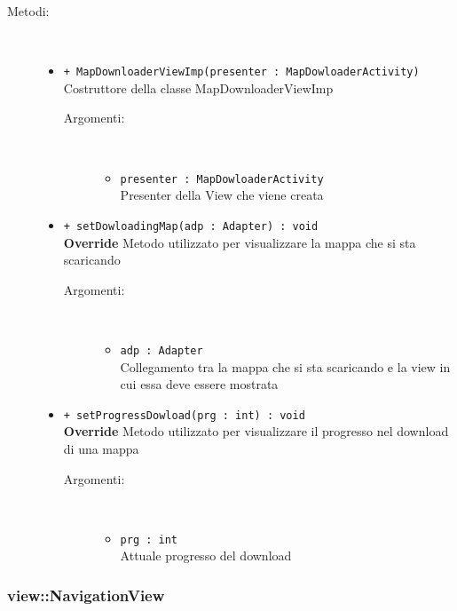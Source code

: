 \documentclass[../DefinizioneDiProdotto.tex]{subfiles}
\begin{document}
\begin{description}
\begin{itemize}
\end{itemize}
\item[Metodi:] \
\begin{itemize}
\item \texttt{+ MapDownloaderViewImp(presenter : MapDowloaderActivity)}\\
Costruttore della classe MapDownloaderViewImp
 \begin{description}
\item[Argomenti:] \
\begin{itemize}
\item \texttt{presenter : MapDowloaderActivity}\\
Presenter della View che viene creata\end{itemize}
\end{description}
\item \texttt{+ setDowloadingMap(adp : Adapter) : void}\\
\textbf{Override} Metodo utilizzato per visualizzare la mappa che si sta scaricando
 \begin{description}
\item[Argomenti:] \
\begin{itemize}
\item \texttt{adp : Adapter}\\
Collegamento tra la mappa che si sta scaricando e la view in cui essa deve essere mostrata\end{itemize}
\end{description}
\item \texttt{+ setProgressDowload(prg : int) : void}\\
\textbf{Override} Metodo utilizzato per visualizzare il progresso nel download di una mappa
 \begin{description}
\item[Argomenti:] \
\begin{itemize}
\item \texttt{prg : int}\\
Attuale progresso del download\end{itemize}
\end{description}
\end{itemize}
\end{description}

\subsubsection{view::NavigationView}
\end{document}
